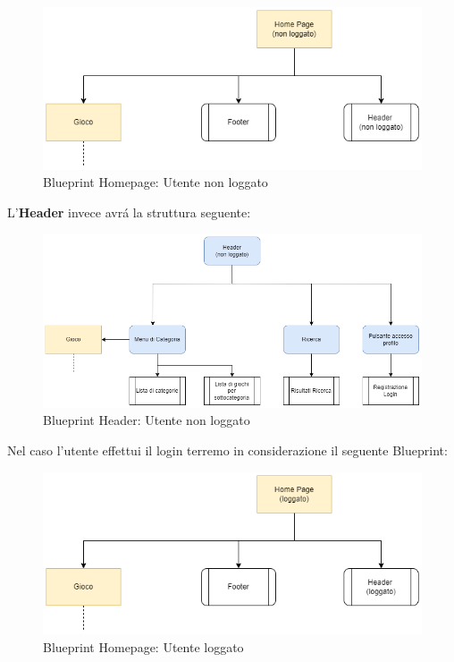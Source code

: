 \documentclass[../Report.tex]{subfiles}
\begin{document}
    \begin{figure}[H]
        \includegraphics[width=\linewidth]{BP_homepage non loggato.png}
        \centering
        \caption{Blueprint Homepage: Utente non loggato}
    \end{figure}

    L'\textbf{Header} invece avrá la struttura seguente:
    
    \begin{figure}[H]
        \includegraphics[width=\linewidth]{BP_HeaderNOLOG.png}
        \centering
        \caption{Blueprint Header: Utente non loggato}
    \end{figure}


    Nel caso l'utente effettui il login terremo in considerazione il seguente Blueprint:

    \begin{figure}[H]
        \includegraphics[width=\linewidth]{BP_homepage loggato.png}
        \centering
        \caption{Blueprint Homepage: Utente loggato}
    \end{figure}
\end{document}
